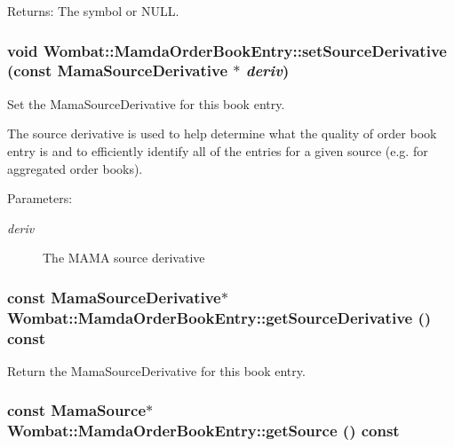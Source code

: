 \begin{Desc}
\item[Returns:]The symbol or NULL. \end{Desc}
\hypertarget{classWombat_1_1MamdaOrderBookEntry_5b88fb6172c7418c6e92043d6b74a631}{
\subsubsection[setSourceDerivative]{\setlength{\rightskip}{0pt plus 5cm}void Wombat::Mamda\-Order\-Book\-Entry::set\-Source\-Derivative (const Mama\-Source\-Derivative $\ast$ {\em deriv})}}
\label{classWombat_1_1MamdaOrderBookEntry_5b88fb6172c7418c6e92043d6b74a631}


Set the Mama\-Source\-Derivative for this book entry. 

The source derivative is used to help determine what the quality of order book entry is and to efficiently identify all of the entries for a given source (e.g. for aggregated order books).

\begin{Desc}
\item[Parameters:]
\begin{description}
\item[{\em deriv}]The MAMA source derivative \end{description}
\end{Desc}
\hypertarget{classWombat_1_1MamdaOrderBookEntry_9a41b69fc139d40f295771c0ca49c294}{
\subsubsection[getSourceDerivative]{\setlength{\rightskip}{0pt plus 5cm}const Mama\-Source\-Derivative$\ast$ Wombat::Mamda\-Order\-Book\-Entry::get\-Source\-Derivative () const}}
\label{classWombat_1_1MamdaOrderBookEntry_9a41b69fc139d40f295771c0ca49c294}


Return the Mama\-Source\-Derivative for this book entry. 

\hypertarget{classWombat_1_1MamdaOrderBookEntry_cda4031007b43ade5911dd36d015baf5}{
\subsubsection[getSource]{\setlength{\rightskip}{0pt plus 5cm}const Mama\-Source$\ast$ Wombat::Mamda\-Order\-Book\-Entry::get\-Source () const}}
\label{classWombat_1_1MamdaOrderBookEntry_cda4031007b43ade5911dd36d015baf5}


